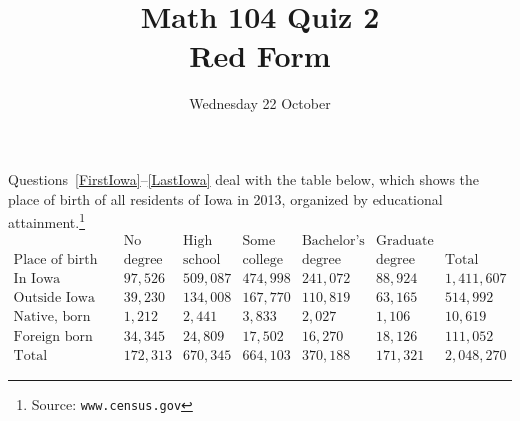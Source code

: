 \documentclass[answers,12pt]{exam}
\title{Math 104 Quiz 2\\Red Form}
\date{Wednesday 22 October}
\begin{document}
\maketitle
\begin{center}
\end{center}

Questions~\ref{FirstIowa}--\ref{LastIowa} deal with
the table below, which shows the place of birth of 
all residents of Iowa
in 2013, organized by educational
attainment.\footnote{Source: \tt www.census.gov}
\[\begin{array}{r|rrrrr|r}
&\text{No}&\text{High}&\text{Some}&\text{Bachelor's}&\text{Graduate}\\
\text{Place of birth}&\text{degree}
&\text{school}&\text{college}&\text{degree}&\text{degree}&\text{Total}
\\\hline
\text{In Iowa}
&97,526&509,087&474,998&241,072&88,924&1,411,607\\
\text{Outside Iowa}
&39,230&134,008&167,770&110,819&63,165&514,992\\
\text{Native, born outside US}
&1,212&2,441&3,833&2,027&1,106&10,619\\
\text{Foreign born}
&34,345&24,809&17,502&16,270&18,126&111,052\\\hline
\text{Total}
&172,313&670,345&664,103&370,188&171,321&2,048,270
\end{array}\]
\end{document}
